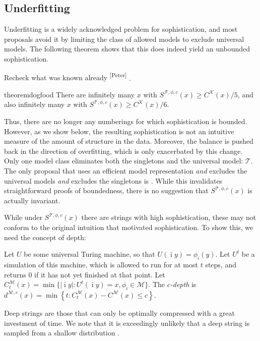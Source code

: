 \documentclass{style/llncs}
\newcommand{\M}{\mathscr M}
\newcommand{\T}{\mathscr T}
\newcommand{\F}{\mathscr F}
\newcommand{\K}{\mathscr K}
\newcommand{\s}{S}
\newcommand{\pb}[1]{\textcolor{OliveGreen}{\small #1 \textsuperscript{[Peter]} }}
\begin{document}
\subsection{Underfitting}
\label{section:underfitting}

Underfitting is a widely acknowledged problem for sophistication, and most proposals avoid it by limiting the class of allowed models to exclude universal models. The following theorem shows that this does indeed yield an unbounded sophistication.

\pb{Recheck what was known already}.
\begin{restatable}{theorem}{dogfood}
There are infinitely many $x$ with $\s^{\F,\phi,c}(x) \geq C^{\K}(x)/5$, and also infinitely many $x$ with $\s^{\T,\phi,c}(x) \geq C^{\K}(x)/6$.
\end{restatable} 
\noindent Thus, there are no longer any numberings for which sophistication is bounded. However, as we show below, the resulting sophistication is not an intuitive measure of the amount of structure in the data. Moreover, the balance is pushed back in the direction of overfitting, which is only exacerbated by this change. Only one model class eliminates both the singletons and the universal model: $\T$. The only proposal that uses an efficient model representation \emph{and} excludes the universal models \emph{and} excludes the singletons is \cite{vitanyi2004meaningful}. While this invalidates straightforward proofs of boundedness, there is no suggestion that $S^{\T, \phi, c}(x)$ is actually invariant.

While under $S^{\T, \phi, c}(x)$ there are strings with high sophistication, these may not conform to the original intuition that motivated sophistication. To show this, we need the concept of depth:

\begin{definition}\belowdisplayskip=-12pt
Let $U$ be some universal Turing machine, so that $U(\bar\imath y) = \phi_i(y)$. Let $U^t$ be a simulation of this machine, which is allowed to run for at most $t$ steps, and returns $0$ if it has not yet finished at that point. Let $C^\M_t(x) = \min\{|\bar\imath y| : U^t(\bar\imath y) = x, \phi_i \in \M\}$. The \emph{$c$-depth} is $d^{\M,c}(x) = \min \left\{t : C^\M_t(x) - C^\M(x) \leq c \right\}$.
\end{definition}
Deep strings are those that can only be optimally compressed with a great investment of time. We note that it is exceedingly unlikely that a deep string is sampled from a shallow distribution \cite{bloem2014safe,bennett1988logical}. 
 
\end{document}
